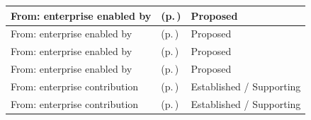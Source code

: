 \begin{longtable}{|>{\raggedright\arraybackslash}p{0.27\TableWidth}|>{\raggedright\arraybackslash}p{0.48\TableWidth}|>{\raggedright\arraybackslash}p{0.25\TableWidth}|}
From: enterprise enabled by & \nameref{cap:bec-care-plan-administration} (p.\,\pageref{cap:bec-care-plan-administration}) & Proposed\\\hline
From: enterprise enabled by & \nameref{cap:bec-information-design-governance} (p.\,\pageref{cap:bec-information-design-governance}) & Proposed\\\hline
From: enterprise enabled by & \nameref{cap:bec-clinical-knowledge-services} (p.\,\pageref{cap:bec-clinical-knowledge-services}) & Proposed\\\hline
From: enterprise enabled by & \nameref{cap:bec-governed-reference-dataset-administration} (p.\,\pageref{cap:bec-governed-reference-dataset-administration}) & Proposed\\\hline
From: enterprise contribution & \nameref{cap:bec-assurance-design} (p.\,\pageref{cap:bec-assurance-design}) & Established / Supporting\\\hline
From: enterprise contribution & \nameref{cap:bec-assurance-criteria-management} (p.\,\pageref{cap:bec-assurance-criteria-management}) & Established / Supporting\\\hline
\end{longtable}\endgroup

